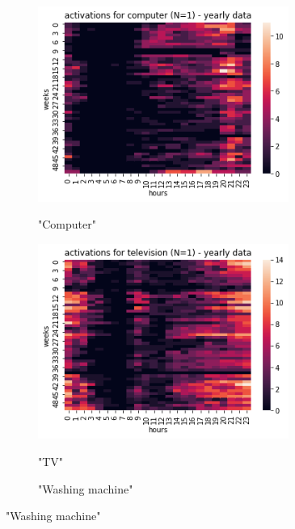 \begin{figure}[H]
	\begin{subfigure}{.32\textwidth}
		\centering
		\caption{"Computer"}
		\includegraphics[width=0.9\textwidth]{../Figures/LPS/HM_Ywh_comp.png}
		\label{fig:HM_Ywh_comp}
	\end{subfigure}%
	\begin{subfigure}{.32\textwidth}
		\centering
		\caption{"TV"}
		\includegraphics[width=0.9\textwidth]{../Figures/LPS/HM_Ywh_tv.png}
		\label{fig:HM_Ywh_tv}
	\end{subfigure}%
	\begin{subfigure}{.32\textwidth}
		\centering
		\caption{"Washing machine"}

\end{subfigure}
\end{figure}
